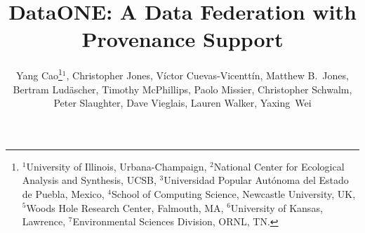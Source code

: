 \documentclass[a4paper]{llncs}
\begin{document}
\mainmatter  %

\title{DataONE: A Data Federation with Provenance Support}


\author{{Yang Cao\thanks{
$^1$University of Illinois, Urbana-Champaign, 
$^2$National Center for Ecological Analysis and Synthesis, UCSB,
$^3$Universidad Popular Aut\'onoma del Estado de Puebla, Mexico,
$^4$School of Computing Science, Newcastle  University, UK,
$^5$Woods Hole Research Center, Falmouth, MA,
$^6$University of Kansas, Lawrence,
$^7$Environmental Sciences Division, ORNL, TN.}$^1$,
Christopher Jones,  V\'ictor Cuevas-Vicentt\'in, Matthew B.\ Jones,  Bertram Lud\"ascher,  Timothy McPhillips,  Paolo Missier,   Christopher Schwalm,  Peter Slaughter,  Dave Vieglais,  Lauren Walker, Yaxing~Wei }}

\institute{\relax}



%
%

\maketitle
\end{document}
